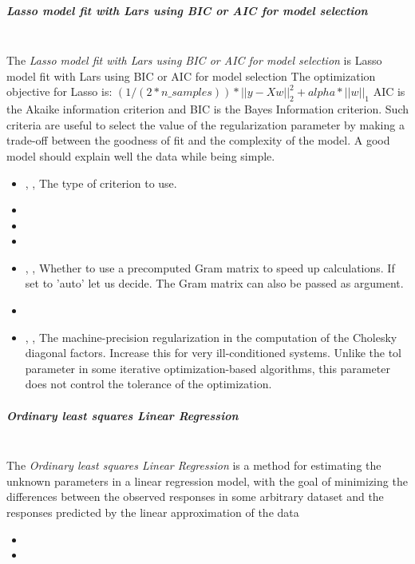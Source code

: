 \subparagraph{Lasso model fit with Lars using BIC or AIC for model selection}
\mbox{}
\\The \textit{Lasso model fit with Lars using BIC or AIC for model selection} is
Lasso model fit with Lars using BIC or AIC for model selection
The optimization objective for Lasso is:
$(1 / (2 * n\_samples)) * ||y - Xw||^2_2 + alpha * ||w||_1$
AIC is the Akaike information criterion and BIC is the Bayes Information
criterion.
%
Such criteria are useful to select the value of the regularization parameter by
making a trade-off between the goodness of fit and the complexity of the model.
%
A good model should explain well the data while being simple.
%
\begin{itemize}
  \item {} , ,
  The type of criterion to use.
  \item {}
  \item \verDescriptionB
  \item {}
  \item {} , ,
  Whether to use a precomputed Gram matrix to speed up calculations.
  If set to 'auto' let us decide.
  The Gram matrix can also be passed as argument.
  \item \maxIterDescription{}
  \item {} , ,
  The machine-precision regularization in the computation of the Cholesky
  diagonal factors.
  Increase this for very ill-conditioned systems.
  Unlike the tol parameter in some iterative optimization-based algorithms, this
  parameter does not control the tolerance of the optimization.
\end{itemize}

\subparagraph{Ordinary least squares Linear Regression}
\mbox{}
\\The \textit{Ordinary least squares Linear Regression} is a method for
estimating the unknown parameters in a linear regression model, with the goal of
minimizing the differences between the observed responses in some arbitrary
dataset and the responses predicted by the linear approximation of the data
\begin{itemize}
  \item {}
  \item {}
\end{itemize}

